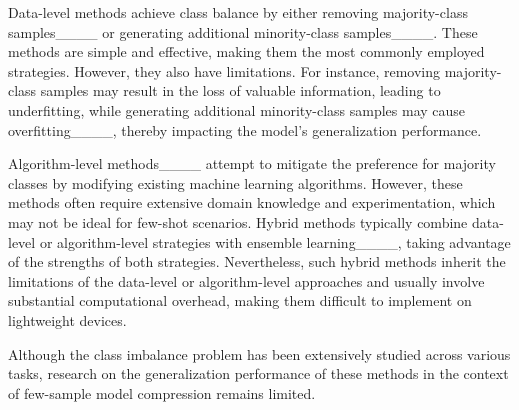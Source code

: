 Data-level methods achieve class balance by either removing majority-class samples____ or generating additional minority-class samples____. These methods are simple and effective, making them the most commonly employed strategies. However, they also have limitations. For instance, removing majority-class samples may result in the loss of valuable information, leading to underfitting, while generating additional minority-class samples may cause overfitting____, thereby impacting the model's generalization performance. 

Algorithm-level methods____ attempt to mitigate the preference for majority classes by modifying existing machine learning algorithms. However, these methods often require extensive domain knowledge and experimentation, which may not be ideal for few-shot scenarios. Hybrid methods typically combine data-level or algorithm-level strategies with ensemble learning____, taking advantage of the strengths of both strategies. Nevertheless, such hybrid methods inherit the limitations of the data-level or algorithm-level approaches and usually involve substantial computational overhead, making them difficult to implement on lightweight devices.

Although the class imbalance problem has been extensively studied across various tasks, research on the generalization performance of these methods in the context of few-sample model compression remains limited.